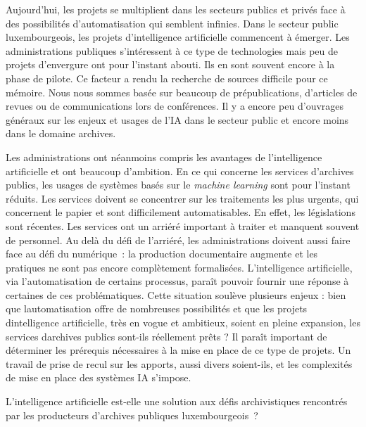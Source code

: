 	Aujourd'hui, les projets se multiplient dans les secteurs publics et privés face à
	des possibilités d'automatisation qui semblent infinies. Dans le secteur
	public luxembourgeois, les projets d'intelligence artificielle
	commencent à émerger. Les administrations publiques s'intéressent à ce
	type de technologies mais peu de projets d'envergure ont pour
	l'instant abouti. Ils en sont souvent encore à la phase de pilote. 
	Ce facteur a rendu la recherche de sources difficile pour ce mémoire. 
	Nous nous sommes basée sur beaucoup de prépublications, d'articles de revues 
	ou de communications lors de conférences. Il y a encore peu d'ouvrages généraux
	 sur les enjeux et usages de l'IA dans le secteur public
	et encore moins dans le domaine archives.
	
	Les administrations ont
	néanmoins compris les avantages de l'intelligence artificielle et ont
	beaucoup d'ambition. En ce qui concerne les services d'archives publics,
	les usages de systèmes basés sur le \emph{machine learning} sont pour l'instant
	réduits. Les services doivent se concentrer sur les traitements les plus
	urgents, qui concernent le papier et sont difficilement automatisables.
	En effet, les législations sont récentes. Les services ont un arriéré
	important à traiter et manquent souvent de personnel. Au delà du défi de
	l'arriéré, les administrations doivent aussi faire face au défi du
	numérique~: la production documentaire augmente et les pratiques ne sont
	pas encore complètement formalisées. L'intelligence artificielle, via l'automatisation
	de certains processus, paraît 
	pouvoir fournir une réponse à certaines de ces problématiques.
	Cette situation soulève plusieurs
	enjeux : bien que l\textquotesingle automatisation offre de nombreuses
	possibilités et que les projets d\textquotesingle intelligence
	artificielle, très en vogue et ambitieux, soient en pleine expansion,
	les services d\textquotesingle archives publics sont-ils réellement
	prêts ? Il paraît important de déterminer les prérequis nécessaires à la
	mise en place de ce type de projets. Un travail de prise de recul sur 
	les apports, aussi divers soient-ils, et les complexités 
	de mise en place des systèmes IA s'impose.

L'intelligence artificielle est-elle une solution aux défis
archivistiques rencontrés par les producteurs d'archives publiques
luxembourgeois~?

